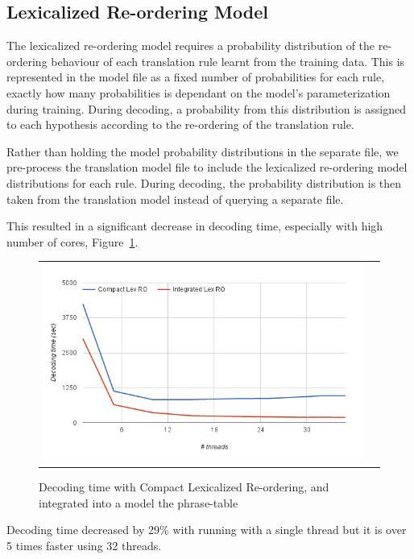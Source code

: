 \documentclass[11pt]{article}
\begin{document}
\subsection{Lexicalized Re-ordering Model}

The lexicalized re-ordering model requires a probability distribution of the re-ordering behaviour of each translation rule learnt from the training data. This is represented in the model file as a fixed number of probabilities for each rule, exactly how many probabilities is dependant on the model's parameterization during training. During decoding, a probability from this distribution is assigned to each hypothesis according to the re-ordering of the translation rule.

Rather than holding the model probability distributions in the separate file, we pre-process the translation model file to include the lexicalized re-ordering model distributions for each rule. During decoding, the probability distribution is then taken from the translation model instead of querying a separate file. 

This resulted in a significant decrease in decoding time, especially with high number of cores, Figure~\ref{fig:lex-ro}. 
\begin{figure}[h]
\centering
\begin{tabular}{cc}
{\includegraphics[scale=0.4]{lex-ro.png}} 
\end{tabular}
\caption{Decoding time with Compact Lexicalized Re-ordering, and integrated into a model the phrase-table}
\label{fig:lex-ro}
\end{figure} 
Decoding time decreased by 29\% with running with a single thread but it is over 5 times faster using 32 threads. %
\end{document}
